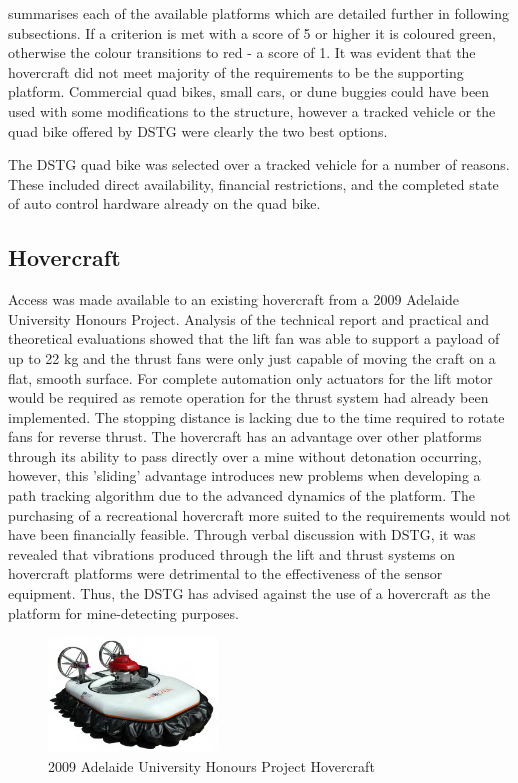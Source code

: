 \documentclass[main.tex]{subfiles}
\begin{document}
 summarises each of the available platforms which are detailed further in following subsections. If a criterion is met with a score of 5 or higher it is coloured green, otherwise the colour transitions to red - a score of 1. It was evident that the hovercraft did not meet majority of the requirements to be the supporting platform. Commercial quad bikes, small cars, or dune buggies could have been used with some modifications to the structure, however a tracked vehicle or the quad bike offered by DSTG were clearly the two best options.

The DSTG quad bike was selected over a tracked vehicle for a number of reasons. These included direct availability, financial restrictions, and the completed state of auto control hardware already on the quad bike.

\subsection{Hovercraft}
Access was made available to an existing hovercraft from a 2009 Adelaide University Honours Project. Analysis of the technical report \parencite{hovercraft2009} and practical and theoretical evaluations showed that the lift fan was able to support a payload of up to 22 kg and the thrust fans were only just capable of moving the craft on a flat, smooth surface. For complete automation only actuators for the lift motor would be required as remote operation for the thrust system had already been implemented. The stopping distance is lacking due to the time required to rotate fans for reverse thrust. The hovercraft has an advantage over other platforms through its ability to pass directly over a mine without detonation occurring, however, this 'sliding' advantage introduces new problems when developing a path tracking algorithm due to the advanced dynamics of the platform. The purchasing of a recreational hovercraft more suited to the requirements would not have been financially feasible. Through verbal discussion with DSTG, it was revealed that vibrations produced through the lift and thrust systems on hovercraft platforms were detrimental to the effectiveness of the sensor equipment. Thus, the DSTG has advised against the use of a hovercraft as the platform for mine-detecting purposes.
\begin{figure}[ht]
\includegraphics[width=0.4\textwidth]{4-ConceptDesign/HovercraftPic.png}
\centering
\caption[2009 Adelaide University Honours Project Hovercraft]{2009 Adelaide University Honours Project Hovercraft \parencite{hovercraft2009}} 
\end{figure}
\end{document}
